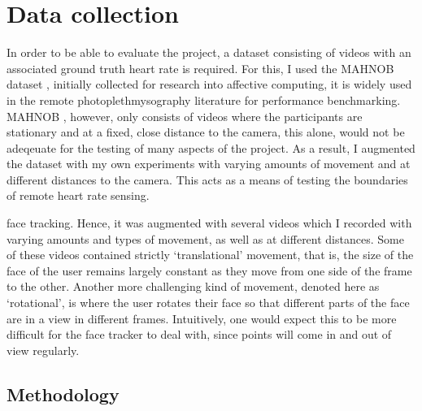 \section{Data collection}
In order to be able to evaluate the project, a dataset consisting of videos with an associated ground truth heart rate is required.
For this, I used the MAHNOB dataset \cite{Mahnob}, initially collected for research into affective computing, it is widely used in the remote photoplethmysography literature for performance benchmarking.
MAHNOB \cite{Mahnob}, however, only consists of videos where the participants are stationary and at a fixed, close distance to the camera, this alone, would not be adeqeuate for the testing of many aspects of the project.
As a result, I augmented the dataset with my own experiments with varying amounts of movement and at different distances to the camera. This acts as a means of testing the boundaries of remote heart rate sensing.


face tracking. 
Hence, it was augmented with several videos which I recorded with varying amounts and types of movement, as well as at different distances.
Some of these videos contained strictly `translational' movement, that is, the size of the face of the user remains largely constant as they move from one side of the frame to the other.
Another more challenging kind of movement, denoted here as `rotational', is where the user rotates their face so that different parts of the face are in a view in different frames.
Intuitively, one would expect this to be more difficult for the face tracker to deal with, since points will come in and out of view regularly.
\subsection{Methodology}

\paragraph{}

